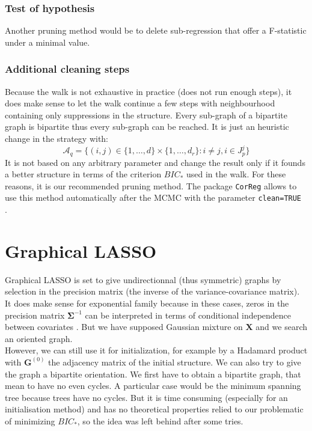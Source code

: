 \documentclass[12pt,a4paper]{report}
\begin{document}
		\subsubsection{Test of hypothesis}
			Another pruning method would be to delete sub-regression that offer a F-statistic under a minimal value.
		\subsubsection{Additional cleaning steps}
			Because the walk is not exhaustive in practice (does not run enough steps), it does make sense to let the walk continue a few steps with neighbourhood containing only suppressions in the structure. Every sub-graph of a bipartite graph is bipartite thus every sub-graph can be reached. It is just an heuristic change in the strategy with:
			\begin{equation}
				\mathcal{A}_q=\{(i,j) \in  \{1,\dots,d\}\times\{1,\dots,d_r\} :i \neq j, i \in J_p^j \}
			\end{equation}
			It is not based on any arbitrary parameter and change the result only if it founds a better structure in terms of the criterion $BIC_*$ used in the walk.
			For these reasons, it is our recommended pruning method. The package {\tt CorReg} allows to use this method automatically after the MCMC with the parameter {\tt clean=TRUE }.
			
	\section{Graphical LASSO}\label{sectionGlasso}
		Graphical LASSO \cite{friedman2008sparse} \cite{witten2011new} \cite{tibshiranilasso} \cite{friedman2010applications} is set to give undirectionnal (thus symmetric) graphs by selection in the precision matrix (the inverse of the variance-covariance matrix). It does make sense for exponential family because in these cases, zeros in the precision matrix $\boldsymbol{\Sigma}^{-1}$ can be interpreted in terms of conditional independence between covariates \cite{dempster1972covariance}. But we have supposed Gaussian mixture on $\boldsymbol{X}$ and we search an oriented graph.\\
		
	However, we can still use it for initialization, for example by a Hadamard product with $\boldsymbol{G}^{(0)}$ the adjacency matrix of the initial structure. We can also try to give the graph a bipartite orientation. We first have to obtain a bipartite graph, that mean to have no even cycles. A particular case would be the minimum spanning tree \cite{graham1985history,moret1991empirical,gower1969minimum} because trees have no cycles. But it is time consuming (especially for an initialisation method) and has no theoretical properties relied to our problematic of minimizing $BIC_*$, so the idea was left behind after some tries.		
	
\end{document}

